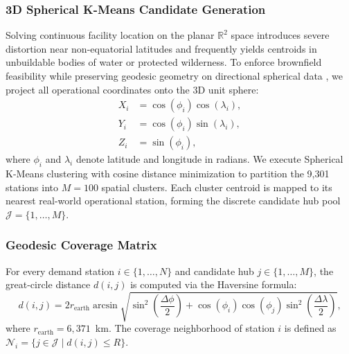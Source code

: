 \documentclass[conference]{IEEEtran}
\begin{document}
\subsubsection{3D Spherical K-Means Candidate Generation}
Solving continuous facility location on the planar $\mathbb{R}^2$ space introduces severe distortion near non-equatorial latitudes and frequently yields centroids in unbuildable bodies of water or protected wilderness. To enforce brownfield feasibility while preserving geodesic geometry on directional spherical data \cite{banerjee2005clustering}, we project all operational coordinates onto the 3D unit sphere:
\begin{equation}
\begin{aligned}
X_i &= \cos(\phi_i) \cos(\lambda_i), \\
Y_i &= \cos(\phi_i) \sin(\lambda_i), \\
Z_i &= \sin(\phi_i),
\end{aligned}
\end{equation}
where $\phi_i$ and $\lambda_i$ denote latitude and longitude in radians. We execute Spherical K-Means clustering with cosine distance minimization to partition the 9,301 stations into $M = 100$ spatial clusters. Each cluster centroid is mapped to its nearest real-world operational station, forming the discrete candidate hub pool $\mathcal{J} = \{1, \dots, M\}$.

\subsubsection{Geodesic Coverage Matrix}
For every demand station $i \in \{1, \dots, N\}$ and candidate hub $j \in \{1, \dots, M\}$, the great-circle distance $d(i, j)$ is computed via the Haversine formula:
\begin{equation}
d(i, j) = 2 r_{\text{earth}} \arcsin \sqrt{\sin^2\left(\frac{\Delta \phi}{2}\right) + \cos(\phi_i)\cos(\phi_j)\sin^2\left(\frac{\Delta \lambda}{2}\right)},
\end{equation}
where $r_{\text{earth}} = 6,371$~km. The coverage neighborhood of station $i$ is defined as $\mathcal{N}_i = \{j \in \mathcal{J} \mid d(i, j) \le R\}$.
\end{document}
